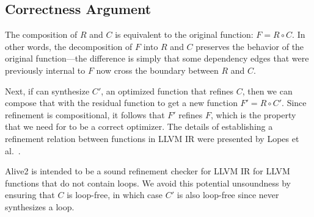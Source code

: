 \subsection{Correctness Argument}

The composition of $R$ and $C$ is equivalent to the original function:
$F = R \circ C$.
%
In other words, the decomposition of $F$ into $R$ and $C$ preserves
the behavior of the original function---the difference is simply that
some dependency edges that were previously internal to $F$ now cross
the boundary between $R$ and $C$.


Next, if \minotaur{} can synthesize $C'$, an optimized function that
refines $C$, then we can compose that with the residual function to
get a new function $F' = R \circ C'$.
%
Since refinement is compositional, it follows that $F'$ refines $F$,
which is the property that we need for \minotaur{} to be a correct
optimizer.
%
The details of establishing a refinement relation between functions in
LLVM IR were presented by Lopes et al.~\cite{alive2}.


Alive2 is intended to be a sound refinement checker for LLVM
IR for LLVM functions that do not contain loops.
%
We avoid this potential unsoundness by ensuring that $C$ is loop-free,
in which case $C'$ is also loop-free since \minotaur{} never synthesizes a
loop.



